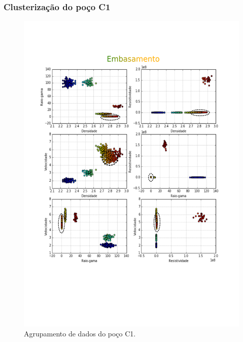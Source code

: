 \documentclass[10pt]{beamer} %
\begin{document}
\begin{frame}
	\frametitle{Clusterização do poço C1}
	\begin{figure}[H]
		\centering
		\includegraphics[scale=0.3]{Imagens/embasamentoC1.png}
		\caption{Agrupamento de dados do poço C1.}
	\end{figure} 
\end{frame}
\end{document}
